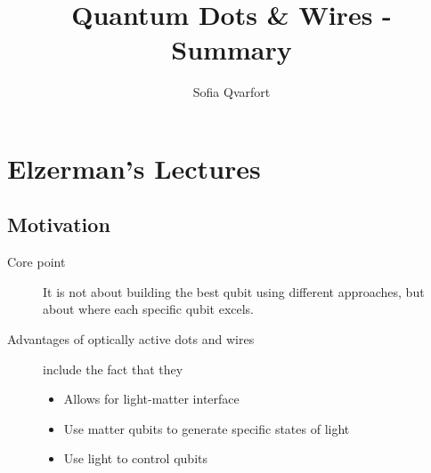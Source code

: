 


\title{Quantum Dots \& Wires - Summary}
\author{Sofia Qvarfort}
\maketitle

\tableofcontents

\section{Elzerman's Lectures}
\subsection{Motivation}
\begin{description}
\item[Core point] It is not about building the best qubit using different approaches, but about where each specific qubit excels. 

\item[Advantages of optically active dots and wires]  include the fact that they
\begin{itemize}
\item Allows for light-matter interface 
\item Use matter qubits to generate specific states of light
\item Use light to control qubits
\end{itemize}

\end{description}
